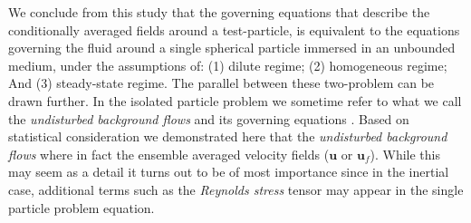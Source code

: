 We conclude from this study that the governing equations that describe the conditionally averaged fields around a test-particle, is equivalent to the equations governing the fluid around a single spherical particle immersed in an unbounded medium, 
under the assumptions of: (1) dilute regime; (2) homogeneous regime; And (3) steady-state regime. 
The parallel between these two-problem can be drawn further. 
In the isolated particle problem we sometime refer to what we call the \textit{undisturbed background flows} and its governing equations \citet{stone2001inertial}. 
Based on statistical consideration we demonstrated here that the \textit{undisturbed background flows} where in fact the ensemble averaged velocity fields ($\textbf{u}$ or $\textbf{u}_f$). 
While this may seem as a detail it turns out to be of most importance since in the inertial case, additional terms such as the \textit{Reynolds stress} tensor may appear in the single particle problem equation. 

